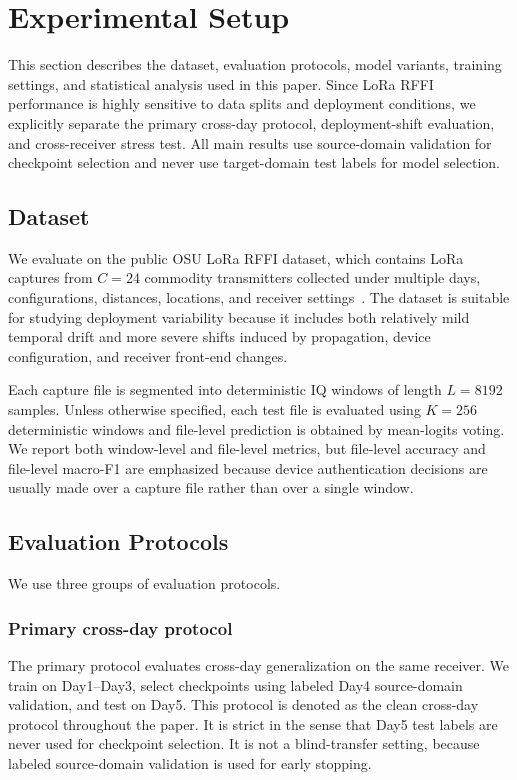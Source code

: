 \section{Experimental Setup}
\label{sec:experiments}

This section describes the dataset, evaluation protocols, model variants, training settings, and statistical analysis used in this paper. Since LoRa RFFI performance is highly sensitive to data splits and deployment conditions, we explicitly separate the primary cross-day protocol, deployment-shift evaluation, and cross-receiver stress test. All main results use source-domain validation for checkpoint selection and never use target-domain test labels for model selection.

\subsection{Dataset}

We evaluate on the public OSU LoRa RFFI dataset, which contains LoRa captures from $C=24$ commodity transmitters collected under multiple days, configurations, distances, locations, and receiver settings~\cite{elmaghbub2021lora_wild,hamdaoui2022deeplearning}. The dataset is suitable for studying deployment variability because it includes both relatively mild temporal drift and more severe shifts induced by propagation, device configuration, and receiver front-end changes.

Each capture file is segmented into deterministic IQ windows of length $L=8192$ samples. Unless otherwise specified, each test file is evaluated using $K=256$ deterministic windows and file-level prediction is obtained by mean-logits voting. We report both window-level and file-level metrics, but file-level accuracy and file-level macro-F1 are emphasized because device authentication decisions are usually made over a capture file rather than over a single window.

\subsection{Evaluation Protocols}

We use three groups of evaluation protocols.

\subsubsection{Primary cross-day protocol}

The primary protocol evaluates cross-day generalization on the same receiver. We train on Day1--Day3, select checkpoints using labeled Day4 source-domain validation, and test on Day5. This protocol is denoted as the clean cross-day protocol throughout the paper. It is strict in the sense that Day5 test labels are never used for checkpoint selection. It is not a blind-transfer setting, because labeled source-domain validation is used for early stopping.

